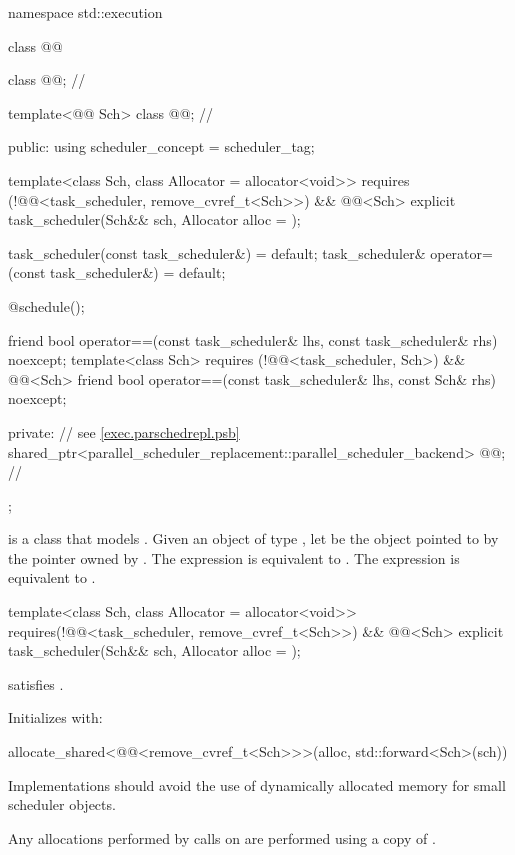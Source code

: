 \begin{codeblock}
namespace std::execution {
  class @@ {
    class @@;                      // \expos

    template<@@ Sch>
      class @@;                  // \expos

  public:
    using scheduler_concept = scheduler_tag;

    template<class Sch, class Allocator = allocator<void>>
      requires (!@@<task_scheduler, remove_cvref_t<Sch>>) && @@<Sch>
    explicit task_scheduler(Sch&& sch, Allocator alloc = {});

    task_scheduler(const task_scheduler&) = default;
    task_scheduler& operator=(const task_scheduler&) = default;

    @\seebelow@ schedule();

    friend bool operator==(const task_scheduler& lhs, const task_scheduler& rhs) noexcept;
    template<class Sch>
      requires (!@@<task_scheduler, Sch>) && @@<Sch>
    friend bool operator==(const task_scheduler& lhs, const Sch& rhs) noexcept;

  private:
    // see \ref{exec.parschedrepl.psb}
    shared_ptr<parallel_scheduler_replacement::parallel_scheduler_backend> @@;  // \expos
  };
}
\end{codeblock}

\pnum
{} is a class that models
.
Given an object  of type , let
 be the object
pointed to by the pointer owned by .
The expression  is equivalent to
.
The expression  is equivalent to
.

\begin{itemdecl}
template<class Sch, class Allocator = allocator<void>>
  requires(!@@<task_scheduler, remove_cvref_t<Sch>>) && @@<Sch>
explicit task_scheduler(Sch&& sch, Allocator alloc = {});
\end{itemdecl}
\begin{itemdescr}
\pnum
\mandates
{} satisfies .

\pnum
\effects
Initializes  with:
\begin{codeblock}
allocate_shared<@@<remove_cvref_t<Sch>>>(alloc, std::forward<Sch>(sch))
\end{codeblock}

\pnum
\recommended
Implementations should avoid the use of dynamically
allocated memory for small scheduler objects.

\pnum
\remarks
Any allocations performed by calls on  are
performed using a copy of .
\end{itemdescr}

